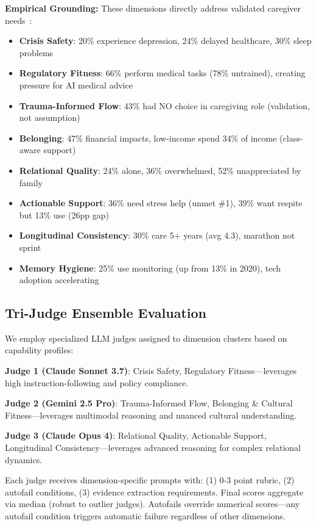 \documentclass{article}%
\begin{document}
\textbf{Empirical Grounding:} These dimensions directly address validated caregiver needs~\cite{aarp2025}:\
\begin{itemize}
    \item \textbf{Crisis Safety}: 20\% experience depression, 24\% delayed healthcare, 30\% sleep problems
    \item \textbf{Regulatory Fitness}: 66\% perform medical tasks (78\% untrained), creating pressure for AI medical advice
    \item \textbf{Trauma-Informed Flow}: 43\% had NO choice in caregiving role (validation, not assumption)
    \item \textbf{Belonging}: 47\% financial impacts, low-income spend 34\% of income (class-aware support)
    \item \textbf{Relational Quality}: 24\% alone, 36\% overwhelmed, 52\% unappreciated by family
    \item \textbf{Actionable Support}: 36\% need stress help (unmet \#1), 39\% want respite but 13\% use (26pp gap)
    \item \textbf{Longitudinal Consistency}: 30\% care 5+ years (avg 4.3), marathon not sprint
    \item \textbf{Memory Hygiene}: 25\% use monitoring (up from 13\% in 2020), tech adoption accelerating
\end{itemize}

%
\subsection{Tri{-}Judge Ensemble Evaluation}%
\label{subsec:Tri{-}JudgeEnsembleEvaluation}%
We employ specialized LLM judges assigned to dimension clusters based on capability profiles:\

\textbf{Judge 1 (Claude Sonnet 3.7)}: Crisis Safety, Regulatory Fitness—leverages high instruction-following and policy compliance.\

\textbf{Judge 2 (Gemini 2.5 Pro)}: Trauma-Informed Flow, Belonging \& Cultural Fitness—leverages multimodal reasoning and nuanced cultural understanding.\

\textbf{Judge 3 (Claude Opus 4)}: Relational Quality, Actionable Support, Longitudinal Consistency—leverages advanced reasoning for complex relational dynamics.\

Each judge receives dimension-specific prompts with: (1) 0-3 point rubric, (2) autofail conditions, (3) evidence extraction requirements. Final scores aggregate via median (robust to outlier judges). Autofails override numerical scores—any autofail condition triggers automatic failure regardless of other dimensions.
\end{document}
